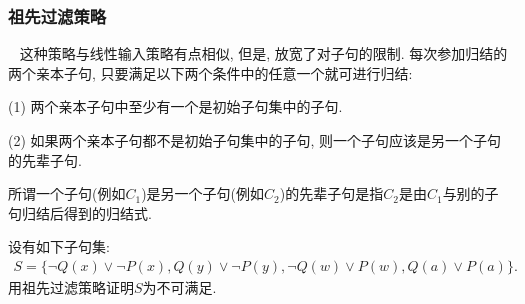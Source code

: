 \subsubsection{祖先过滤策略}~{}
    这种策略与线性输入策略有点相似, 但是, 放宽了对子句的限制. 每次参加归结的两个亲本子句, 只要满足以下两个条件中的任意一个就可进行归结:

(1) 两个亲本子句中至少有一个是初始子句集中的子句.

(2) 如果两个亲本子句都不是初始子句集中的子句, 则一个子句应该是另一个子句的先辈子句.

\begin{remark}
    所谓一个子句(例如$C_1$)是另一个子句(例如$C_2$)的先辈子句是指$C_2$是由$C_1$与别的子句归结后得到的归结式.
\end{remark}

\begin{example}
设有如下子句集:
\begin{align}
  S=\{\neg Q(x)\vee \neg P(x),  Q(y)\vee \neg P(y), \neg Q(w)\vee P(w) ,  Q(a)\vee P(a)\}.
\end{align}
用祖先过滤策略证明$S$为不可满足.
\end{example}
